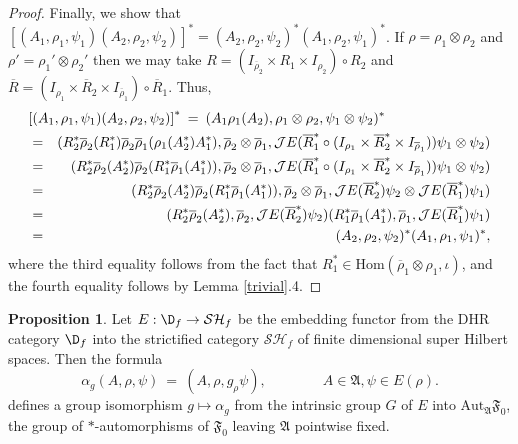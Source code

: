 \documentclass[11pt]{article}
\newcommand{\alg}[1]{\mathfrak{#1}}
\theoremstyle{definition}
\newtheorem{prop}[thm]{Proposition}
\theoremstyle{definition}
\theoremstyle{remark}
\def\2#1{{\mathcal #1}}
\def\ol#1{{\overline #1}}
\def\a{\alpha} \def\b{\beta} \def\g{\gamma} \def\d{\delta}
\newcommand{\Hom}{\mathrm{Hom}}
\newcommand{\Aut}{\mathrm{Aut}}
\begin{document}
\begin{proof}
Finally, we show that $[(A_1,\rho _1,\psi _1)(A_2,\rho _2,\psi _2)]^*=(A_2,\rho
_2,\psi _2)^*(A_1,\rho _2,\psi _1)^*$.  If $\rho =\rho _1\otimes \rho _2$ and $\rho
'=\rho _1'\otimes \rho _2'$ then we may take $R=(I_{\ol\rho _2}\times R_1\times
I_{\rho _2})\circ R_2$ and $\ol R=(I_{\rho _1}\times \ol R_2\times I_{\ol\rho
  _1})\circ \ol R_1$.  Thus,
\begin{eqnarray*}
  \lefteqn{ \left[ (A_1,\rho _1,\psi _1)(A_2,\rho _2,\psi _2)\right] ^*  \: =\: (A_1\rho
    _1(A_2),\rho _1\otimes \rho _2,\psi _1\otimes \psi  _2)^* } \\
  &=& (R_2^*\ol\rho _2(R_1^*)\ol\rho _2\ol\rho _1(\rho
  _1(A_2^*)A_1^*),\ol\rho _2\otimes \ol\rho _1,\2JE(\ol
  R_1^*\circ (I_{\rho _1}\times \ol R_2^*\times I_{\ol\rho _1}))\psi _1\otimes \psi
  _2 ) \\
  &=& (R_2^*\ol\rho _2(A_2^*)\ol\rho _2(R_1^*\ol\rho _1(A_1^*)),\ol\rho _2\otimes
  \ol\rho _1,\2JE(\ol R_1^*\circ
  (I_{\rho _1}\times \ol R_2^*\times I_{\ol\rho _1}))\psi _1\otimes \psi _2) \\
  &=& (R_2^*\ol\rho _2(A_2^*)\ol\rho _2(R_1^*\ol\rho _1(A_1^*)),\ol\rho _2\otimes \ol\rho_1,\2JE(\ol R_2^*)\psi
  _2\otimes \2JE(\ol R_1^*)\psi _1) \\
  &=& (R_2^*\ol\rho _2(A_2^*),\ol\rho _2 ,\2JE(\ol R_2^*)\psi _2)(R_1^*\ol \rho
  _1(A_1^*), \ol\rho _1,\2JE(\ol
  R_1^*)\psi _1) \\
  &=& (A_2,\rho _2,\psi _2)^*(A_1,\rho _1,\psi _1)^* ,\end{eqnarray*}
where the third equality follows from the fact that $R_1^*\in \Hom (\ol\rho _1\otimes
\rho _1,\iota )$, and the fourth equality follows by Lemma \ref{trivial}.4. 
\end{proof}


\begin{prop} Let $E:\D _f\to \2S\2H_f$ be the embedding functor from the DHR
  category $\D _f$ into the strictified category $\2S\2H_f$ of finite dimensional
  super Hilbert spaces.  Then the formula 
  \begin{equation} \a _g(A,\rho ,\psi )\: =\: (A,\rho
    ,g_\rho \psi ),\qquad \qquad A\in \alg{A},\psi \in
    E(\rho ). \label{automorphism} \end{equation}
  defines a group isomorphism $g\mapsto \a _g$ from the
  intrinsic group $G$ of $E$ into $\Aut
  _{\alg{A}}\alg{F}_0$, the group of $*$-automorphisms
  of $\alg{F}_0$ leaving $\alg{A}$ pointwise
  fixed.  \label{group-isomorphism} \end{prop}
\end{document}
